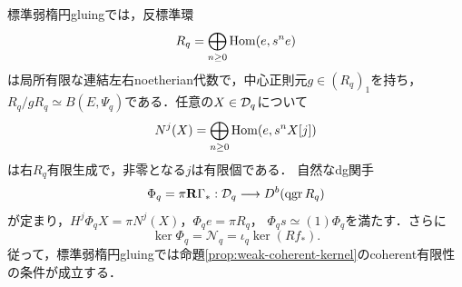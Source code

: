 \begin{theorem}[弱gluingにおけるcoherent導来切断]\label{thm:weak-coherent-sections}
標準弱楕円gluingでは，反標準環
\[
 R_q=\bigoplus_{n\ge0}\operatorname{Hom}(e,s^ne)
\]
は局所有限な連結左右noetherian代数で，中心正則元$g\in(R_q)_1$を持ち，
$R_q/gR_q\simeq B(E,\Psi_q)$である．任意の$X\in\mathcal D_q$について
\[
 N^j(X)=\bigoplus_{n\ge0}\operatorname{Hom}(e,s^nX[j])
\]
は右$R_q$有限生成で，非零となる$j$は有限個である．
自然なdg関手
\[
 \Phi_q=\pi\mathbf R\Gamma_*:\mathcal D_q\longrightarrow D^b(\operatorname{qgr} R_q)
\]
が定まり，$H^j\Phi_qX=\pi N^j(X)$，$\Phi_qe=\pi R_q$，
$\Phi_qs\simeq(1)\Phi_q$を満たす．さらに
\begin{equation}\label{eq:weak-coherent-kernel-final}
 \boxed{\ker\Phi_q=\mathcal N_q=\iota_q\ker(Rf_*).}
\end{equation}
従って，標準弱楕円gluingでは命題\ref{prop:weak-coherent-kernel}のcoherent有限性の条件が成立する．
\end{theorem}
